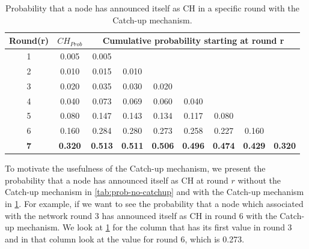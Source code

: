     
\begin{table}[bt]
\centering
\caption{Probability that a node has announced itself as CH in a specific round with the Catch-up mechanism.}
\label{tab:prob-catchup}
\begin{tabular}{|c|c|c|cccccc|}
\hline
\textbf{Round(r)} & \textbf{$CH_{Prob}$} & \multicolumn{7}{c|}{\textbf{Cumulative probability starting at round r}}                                                                                       \\ \hline
1                 & 0.005                & 0.005 &                            &                            &                            &                            &                            &       \\ \cline{1-4}
2                 & 0.010                & 0.015 & \multicolumn{1}{c|}{0.010} &                            &                            &                            &                            &       \\ \cline{1-5}
3                 & 0.020                & 0.035 & \multicolumn{1}{c|}{0.030} & \multicolumn{1}{c|}{0.020} &                            &                            &                            &       \\ \cline{1-6}
4                 & 0.040                & 0.073 & \multicolumn{1}{c|}{0.069} & \multicolumn{1}{c|}{0.060} & \multicolumn{1}{c|}{0.040} &                            &                            &       \\ \cline{1-7}
5                 & 0.080                & 0.147 & \multicolumn{1}{c|}{0.143} & \multicolumn{1}{c|}{0.134} & \multicolumn{1}{c|}{0.117} & \multicolumn{1}{c|}{0.080} &                            &       \\ \cline{1-8}
6                 & 0.160                & 0.284 & \multicolumn{1}{c|}{0.280} & \multicolumn{1}{c|}{0.273} & \multicolumn{1}{c|}{0.258} & \multicolumn{1}{c|}{0.227} & \multicolumn{1}{c|}{0.160} &       \\ \hline
\textbf{7}                 & \textbf{0.320}                & \textbf{0.513} & \multicolumn{1}{c|}{\textbf{0.511}} & \multicolumn{1}{c|}{\textbf{0.506}} & \multicolumn{1}{c|}{\textbf{0.496}} & \multicolumn{1}{c|}{\textbf{0.474}} & \multicolumn{1}{c|}{\textbf{0.429}} & \textbf{0.320} \\ \hline
\end{tabular}
\end{table}


To motivate the usefulness of the Catch-up mechanism, we present the probability that a node has announced itself as CH at round $r$ without the Catch-up mechanism in \cref{tab:prob-no-catchup} and with the Catch-up mechanism in \cref{tab:prob-catchup}. For example, if we want to see the probability that a node which associated with the network round 3 has announced itself as CH in round 6 with the Catch-up mechanism. We look at \cref{tab:prob-catchup} for the column that has its first value in round 3 and in that column look at the value for round 6, which is 0.273.

